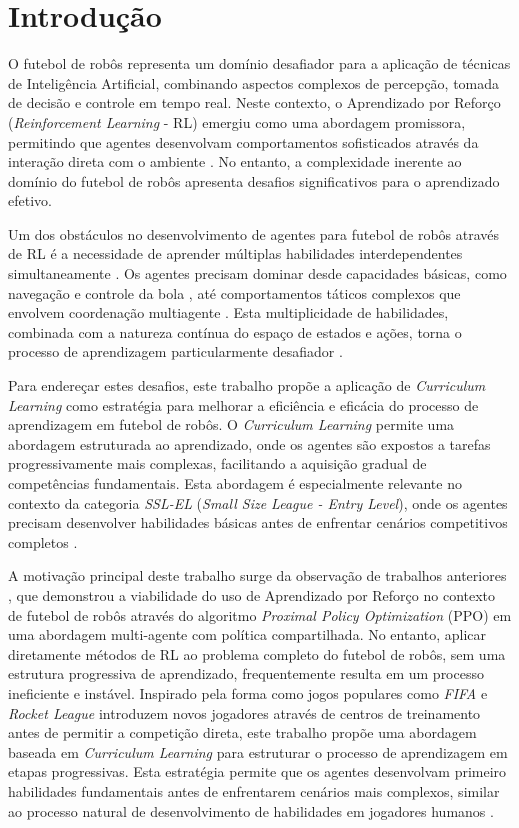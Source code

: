 
\chapter{Introdução}
\label{cap:intro}

O futebol de robôs representa um domínio desafiador para a aplicação de técnicas de Inteligência Artificial, combinando aspectos complexos de percepção, tomada de decisão e controle em tempo real. Neste contexto, o Aprendizado por Reforço (\textit{Reinforcement Learning} - RL) emergiu como uma abordagem promissora, permitindo que agentes desenvolvam comportamentos sofisticados através da interação direta com o ambiente \cite{sutton}. No entanto, a complexidade inerente ao domínio do futebol de robôs apresenta desafios significativos para o aprendizado efetivo.

Um dos obstáculos no desenvolvimento de agentes para futebol de robôs através de RL é a necessidade de aprender múltiplas habilidades interdependentes simultaneamente \cite{ssl_skills}. Os agentes precisam dominar desde capacidades básicas, como navegação e controle da bola \cite{soccer_skills_bipedal_robot}, até comportamentos táticos complexos que envolvem coordenação multiagente \cite{bruno_brandao}. Esta multiplicidade de habilidades, combinada com a natureza contínua do espaço de estados e ações, torna o processo de aprendizagem particularmente desafiador \cite{soccer_skills_bipedal_robot}.

Para endereçar estes desafios, este trabalho propõe a aplicação de \textit{Curriculum Learning} \cite{curriculum} como estratégia para melhorar a eficiência e eficácia do processo de aprendizagem em futebol de robôs. O \textit{Curriculum Learning} permite uma abordagem estruturada ao aprendizado, onde os agentes são expostos a tarefas progressivamente mais complexas, facilitando a aquisição gradual de competências fundamentais. Esta abordagem é especialmente relevante no contexto da categoria \textit{SSL-EL} (\textit{Small Size League - Entry Level}), onde os agentes precisam desenvolver habilidades básicas antes de enfrentar cenários competitivos completos \cite{regras_ssl_el_2024}.

A motivação principal deste trabalho surge da observação de trabalhos anteriores \cite{bruno_brandao}, que demonstrou a viabilidade do uso de Aprendizado por Reforço no contexto de futebol de robôs através do algoritmo \textit{Proximal Policy Optimization} (PPO) em uma abordagem multi-agente com política compartilhada. No entanto, aplicar diretamente métodos de RL ao problema completo do futebol de robôs, sem uma estrutura progressiva de aprendizado, frequentemente resulta em um processo ineficiente e instável. Inspirado pela forma como jogos populares como \textit{FIFA} e \textit{Rocket League} introduzem novos jogadores através de centros de treinamento antes de permitir a competição direta, este trabalho propõe uma abordagem baseada em \textit{Curriculum Learning} para estruturar o processo de aprendizagem em etapas progressivas. Esta estratégia permite que os agentes desenvolvam primeiro habilidades fundamentais antes de enfrentarem cenários mais complexos, similar ao processo natural de desenvolvimento de habilidades em jogadores humanos \cite{relay_long_horizon}.

